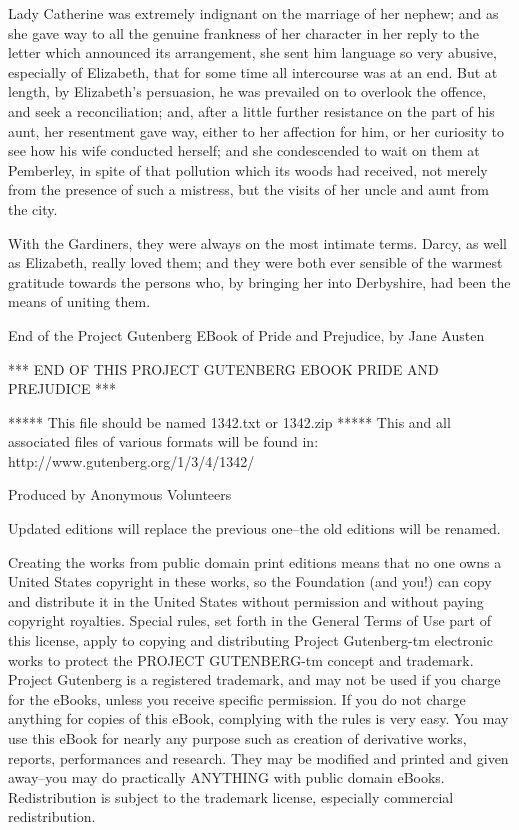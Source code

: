 \documentclass{article}
\begin{document}
Lady Catherine was extremely indignant on the marriage of her nephew;
and as she gave way to all the genuine frankness of her character in
her reply to the letter which announced its arrangement, she sent him
language so very abusive, especially of Elizabeth, that for some time
all intercourse was at an end. But at length, by Elizabeth's persuasion,
he was prevailed on to overlook the offence, and seek a reconciliation;
and, after a little further resistance on the part of his aunt, her
resentment gave way, either to her affection for him, or her curiosity
to see how his wife conducted herself; and she condescended to wait
on them at Pemberley, in spite of that pollution which its woods had
received, not merely from the presence of such a mistress, but the
visits of her uncle and aunt from the city.

With the Gardiners, they were always on the most intimate terms.
Darcy, as well as Elizabeth, really loved them; and they were both ever
sensible of the warmest gratitude towards the persons who, by bringing
her into Derbyshire, had been the means of uniting them.





End of the Project Gutenberg EBook of Pride and Prejudice, by Jane Austen

*** END OF THIS PROJECT GUTENBERG EBOOK PRIDE AND PREJUDICE ***

***** This file should be named 1342.txt or 1342.zip *****
This and all associated files of various formats will be found in:
        http://www.gutenberg.org/1/3/4/1342/

Produced by Anonymous Volunteers

Updated editions will replace the previous one--the old editions
will be renamed.

Creating the works from public domain print editions means that no
one owns a United States copyright in these works, so the Foundation
(and you!) can copy and distribute it in the United States without
permission and without paying copyright royalties.  Special rules,
set forth in the General Terms of Use part of this license, apply to
copying and distributing Project Gutenberg-tm electronic works to
protect the PROJECT GUTENBERG-tm concept and trademark.  Project
Gutenberg is a registered trademark, and may not be used if you
charge for the eBooks, unless you receive specific permission.  If you
do not charge anything for copies of this eBook, complying with the
rules is very easy.  You may use this eBook for nearly any purpose
such as creation of derivative works, reports, performances and
research.  They may be modified and printed and given away--you may do
practically ANYTHING with public domain eBooks.  Redistribution is
subject to the trademark license, especially commercial
redistribution.
\end{document}
